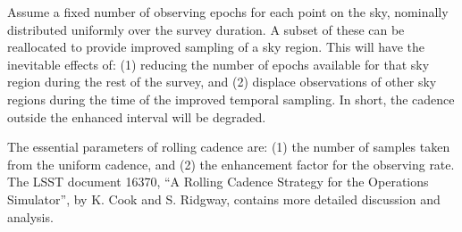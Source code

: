 Assume a fixed number of observing epochs for each point on the sky, nominally distributed uniformly over the survey duration.  A subset of these can be reallocated to provide improved sampling of a sky region.  This will have the inevitable effects of: (1) reducing the number of epochs available for that sky region during the rest of the survey, and (2) displace observations of other sky regions during the time of the improved temporal sampling.  In short, the cadence outside the enhanced interval will be degraded.

The essential parameters of rolling cadence are: (1) the number of samples taken from the uniform cadence, and (2) the enhancement factor for the observing rate.  The LSST document 16370, ``A Rolling Cadence Strategy for the Operations Simulator'', by K. Cook and S. Ridgway,  contains more detailed discussion and analysis.

